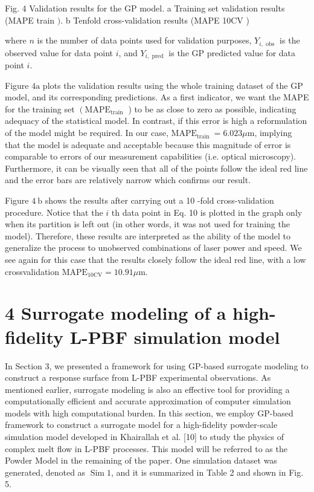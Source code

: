 \documentclass[10pt]{article}
\begin{document}
Fig. 4 Validation results for the GP model. a Training set validation results (MAPE train $)$. b Tenfold cross-validation results (MAPE 10CV )

where $n$ is the number of data points used for validation purposes, $Y_{i, \text { obs }}$ is the observed value for data point $i$, and $Y_{i, \text { pred }}$ is the GP predicted value for data point $i$.

Figure $4 \mathrm{a}$ plots the validation results using the whole training dataset of the GP model, and its corresponding predictions. As a first indicator, we want the MAPE for the training set $\left(\mathrm{MAPE}_{\text {train }}\right.$ ) to be as close to zero as possible, indicating adequacy of the statistical model. In contrast, if this error is high a reformulation of the model might be required. In our case, $\mathrm{MAPE}_{\text {train }}=6.023 \mu \mathrm{m}$, implying that the model is adequate and acceptable because this magnitude of error is comparable to errors of our measurement capabilities (i.e. optical microscopy). Furthermore, it can be visually seen that all of the points follow the ideal red line and the error bars are relatively narrow which confirms our result.

Figure $4 \mathrm{~b}$ shows the results after carrying out a 10 -fold cross-validation procedure. Notice that the $i$ th data point in Eq. 10 is plotted in the graph only when its partition is left out (in other words, it was not used for training the model). Therefore, these results are interpreted as the ability of the model to generalize the process to unobserved combinations of laser power and speed. We see again for this case that the results closely follow the ideal red line, with a low crossvalidation $\mathrm{MAPE}_{10 \mathrm{CV}}=10.91 \mu \mathrm{m}$.

\section*{4 Surrogate modeling of a high-fidelity L-PBF simulation model}
In Section 3, we presented a framework for using GP-based surrogate modeling to construct a response surface from L-PBF experimental observations. As mentioned earlier, surrogate modeling is also an effective tool for providing a computationally efficient and accurate approximation of computer simulation models with high computational burden. In this section, we employ GP-based framework to construct a surrogate model for a high-fidelity powder-scale simulation model developed in Khairallah et al. [10] to study the physics of complex melt flow in L-PBF processes. This model will be referred to as the Powder Model in the remaining of the paper. One simulation dataset was generated, denoted as $\operatorname{Sim} 1$, and it is summarized in Table 2 and shown in Fig. 5.
\end{document}
